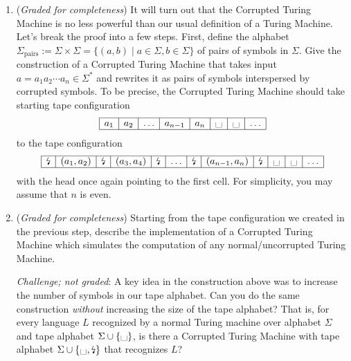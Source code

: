 \documentclass[12pt, oneside]{article}
\newcommand{\gradeComplete}{({\it Graded for completeness}) }
\newcommand{\blank}{\scalebox{1.5}{\textvisiblespace}}
\newcommand{\corrupted}{\text{\lightning}}
\begin{document}
\begin{enumerate}
\begin{enumerate}
\item\gradeComplete It will turn out that the Corrupted Turing Machine is no less powerful than our 
usual definition of a Turing Machine. Let's break the proof into a few steps. First, define the 
alphabet $\Sigma_{\mathrm{pairs}}:= \Sigma \times \Sigma = \{ (a,b) \mid a \in \Sigma, b \in \Sigma\}$ 
of pairs of symbols in $\Sigma$. Give the construction of a Corrupted Turing Machine that takes 
input $a = a_1 a_2 \cdots a_n \in \Sigma^*$ and rewrites it as pairs of symbols interspersed 
by corrupted symbols. To be precise, the Corrupted Turing Machine should take starting tape configuration
\[
\begin{array}{| c | c | c | c | c | c | c | c | }  \hline
a_1 & a_2 & \ldots & a_{n-1} & a_{n} & \blank & \blank & \ldots \\ \hline
\end{array}
\]
to the tape configuration 
\[
\begin{array}{| c | c | c | c | c | c | c | c | c | c | c | c| }  \hline
\corrupted & (a_1, a_2) & \corrupted & (a_3,a_4) & \corrupted & \ldots& \corrupted 
& (a_{n-1}, a_{n}) & \corrupted & \blank & \blank & \ldots \\ \hline
\end{array}
\]
with the head once again pointing to the first cell. For simplicity, you may assume that $n$ is even.

\item\gradeComplete Starting from the tape configuration we created in the previous step, 
describe the implementation of a Corrupted Turing Machine which simulates the computation of 
any normal/uncorrupted Turing Machine.

\vspace{1em}
\noindent\textit{Challenge; not graded}: A key idea in the construction above was 
to increase the number of symbols in our tape alphabet. Can you do the same construction 
\emph{without} increasing the size of the tape alphabet? That is, for every language $L$ 
recognized by a normal Turing machine over alphabet $\Sigma$ and tape alphabet $\Sigma \cup \{\blank\}$, 
is there a Corrupted Turing Machine with tape alphabet $\Sigma \cup \{\blank,\corrupted\}$ that recognizes $L$?

\end{enumerate}




\end{enumerate}
\end{document}
